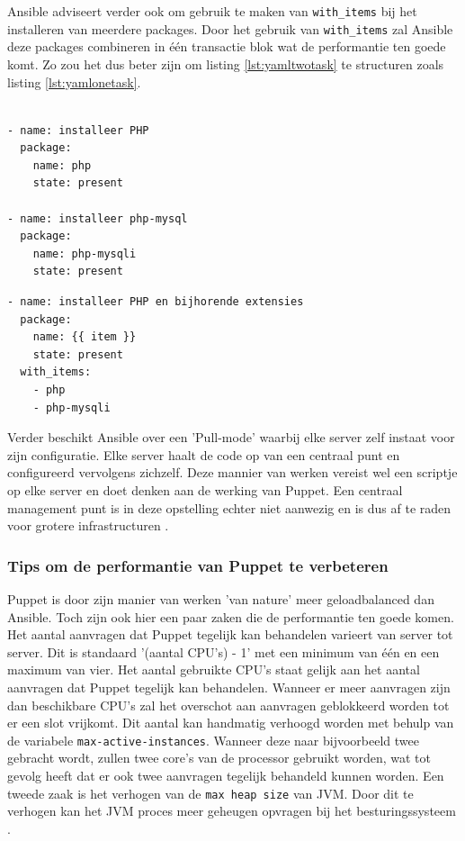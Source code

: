 Ansible adviseert verder ook om gebruik te maken van \texttt{with\_items} bij het installeren van meerdere packages. Door het gebruik van \texttt{with\_items} zal Ansible deze packages combineren in \'e\'en transactie blok wat de performantie ten goede komt. Zo zou het dus beter zijn om listing \ref{lst:yamltwotask} te structuren zoals listing \ref{lst:yamlonetask}. 


\begin{lstlisting}[frame=single]

- name: installeer PHP
  package:
    name: php
    state: present

- name: installeer php-mysql
  package:
    name: php-mysqli
    state: present
\end{lstlisting}

\begin{lstlisting}[frame=single]
- name: installeer PHP en bijhorende extensies
  package:
    name: {{ item }}
    state: present
  with_items:
    - php
    - php-mysqli
\end{lstlisting}

  Verder beschikt Ansible over een 'Pull-mode' waarbij elke server zelf instaat voor zijn configuratie. Elke server haalt de code op van een centraal punt en configureerd vervolgens zichzelf. Deze mannier van werken vereist wel een scriptje op elke server en doet denken aan de werking van Puppet. Een centraal management punt is in deze opstelling echter niet aanwezig en is dus af te raden voor grotere infrastructuren \autocite{AnsibleTuning} .
  
 \subsubsection{Tips om de performantie van Puppet te verbeteren}
 Puppet is door zijn manier van werken 'van nature' meer geloadbalanced dan Ansible. Toch zijn ook hier een paar zaken die de performantie ten goede komen. Het aantal aanvragen dat Puppet tegelijk kan behandelen varieert van server tot server. Dit is standaard '(aantal CPU's) - 1' met een minimum van \'e\'en en een maximum van vier. Het aantal gebruikte CPU's staat gelijk aan het aantal aanvragen dat Puppet tegelijk kan behandelen. Wanneer er meer aanvragen zijn dan beschikbare CPU's zal het overschot aan aanvragen geblokkeerd worden tot er een slot vrijkomt. Dit aantal kan handmatig verhoogd worden met behulp van de variabele \texttt{max-active-instances}. Wanneer deze naar bijvoorbeeld twee gebracht wordt, zullen twee core's van de processor gebruikt worden, wat tot gevolg heeft dat er ook twee aanvragen tegelijk behandeld kunnen worden. \newline
 Een tweede zaak is het verhogen van de \texttt{max heap size} van JVM. Door dit te verhogen kan het JVM proces meer geheugen opvragen bij het besturingssysteem \autocite{PuppetTuning}.
 

